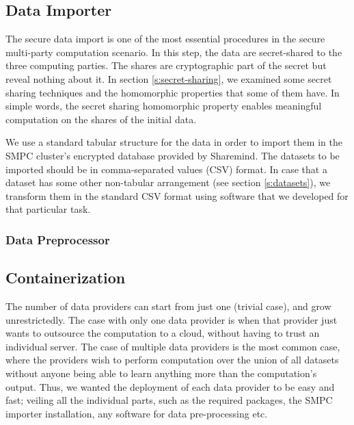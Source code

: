 \subsection{Data Importer}\label{ss:data-providers-importer}
The secure data import is one of the most essential procedures in the secure multi-party computation scenario.
In this step, the data are secret-shared to the three computing parties.
The shares are cryptographic part of the secret but reveal nothing about it.
In section \ref{s:secret-sharing}, we examined some secret sharing techniques and the homomorphic properties that some of them have.
In simple words, the secret sharing homomorphic property enables meaningful computation on the shares of the initial data.

We use a standard tabular structure for the data in order to import them in the SMPC cluster's encrypted database provided by Sharemind.
The datasets to be imported should be in comma-separated values (CSV) format.
In case that a dataset has some other non-tabular arrangement (see section \ref{s:datasets}), we transform them in the standard CSV format using software that we developed for that particular task.



\subsubsection{Data Preprocessor}\label{sss:data-providers-preprocessor}




\subsection{Containerization}\label{ss:data-providers-containerization}
The number of data providers can start from just one (trivial case), and grow unrestrictedly.
The case with only one data provider is when that provider just wants to outsource the computation to a cloud, without having to trust an individual server.
The case of multiple data providers is the most common case, where the providers wish to perform computation over the union of all datasets without anyone being able to learn anything more than the computation's output.
Thus, we wanted the deployment of each data provider to be easy and fast; veiling all the individual parts, such as the required packages, the SMPC importer installation, any software for data pre\hyp processing etc.

